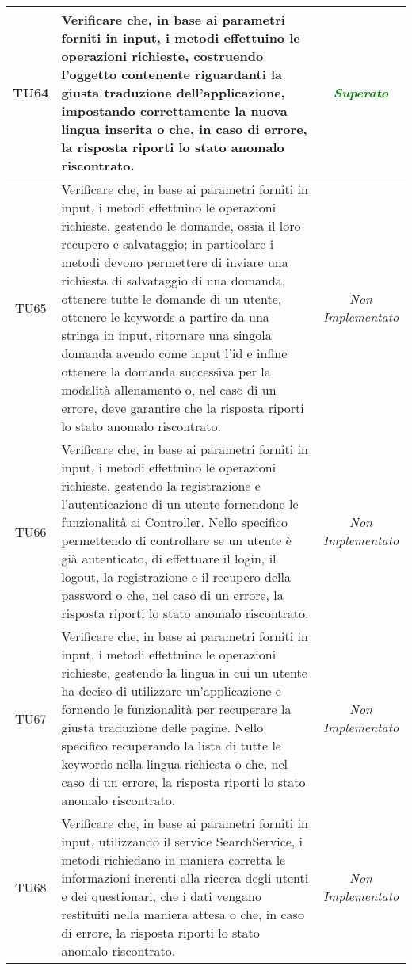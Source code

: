 \begin{longtable}{|c|>{}m{10cm}|c|}
\hypertarget{TU64}{TU64} & Verificare che, in base ai parametri forniti in input,
i metodi effettuino le operazioni richieste, costruendo l’oggetto contenente riguardanti la giusta traduzione dell’applicazione, impostando correttamente la nuova lingua inserita o che, in caso di errore, la risposta riporti lo stato anomalo riscontrato. & \textcolor{Green}{\textit{Superato}}\\ \hline
\hypertarget{TU65}{TU65} & Verificare che, in base ai parametri forniti in input, i metodi effettuino le operazioni richieste, gestendo le domande, ossia il loro recupero e salvataggio; in particolare i metodi devono permettere di inviare una richiesta di salvataggio di una domanda, ottenere tutte le domande di un utente, ottenere le keywords a partire da una stringa in input, ritornare una singola domanda avendo come input l'id e infine ottenere la domanda successiva per la modalità allenamento o, nel caso di un errore, deve garantire che la risposta riporti lo stato anomalo riscontrato. & \textit{Non Implementato}\\ \hline
\hypertarget{TU66}{TU66} & Verificare che, in base ai parametri forniti in input, i metodi effettuino le operazioni richieste, gestendo la registrazione e l'autenticazione di un utente fornendone le funzionalità ai Controller. Nello specifico permettendo di controllare se un utente è già autenticato, di effettuare il login, il logout, la registrazione e il recupero della password o che, nel caso di un errore, la risposta riporti lo stato anomalo riscontrato. & \textit{Non Implementato}\\ \hline
\hypertarget{TU67}{TU67} & Verificare che, in base ai parametri forniti in input, i metodi effettuino le operazioni richieste, gestendo la lingua in cui un utente ha deciso di utilizzare un'applicazione e fornendo le funzionalità per recuperare la giusta traduzione delle pagine. Nello specifico recuperando la lista di tutte le keywords nella lingua richiesta o che, nel caso di un errore, la risposta riporti lo stato anomalo riscontrato. & \textit{Non Implementato}\\ \hline
\hypertarget{TU68}{TU68} & Verificare che, in base ai parametri forniti in input, utilizzando il service SearchService, i metodi richiedano in maniera corretta le informazioni inerenti alla ricerca degli utenti e dei questionari, che i dati vengano restituiti nella maniera attesa o che, in caso di errore, la risposta riporti lo stato anomalo riscontrato. & \textit{Non Implementato}\\ \hline

\end{longtable}
